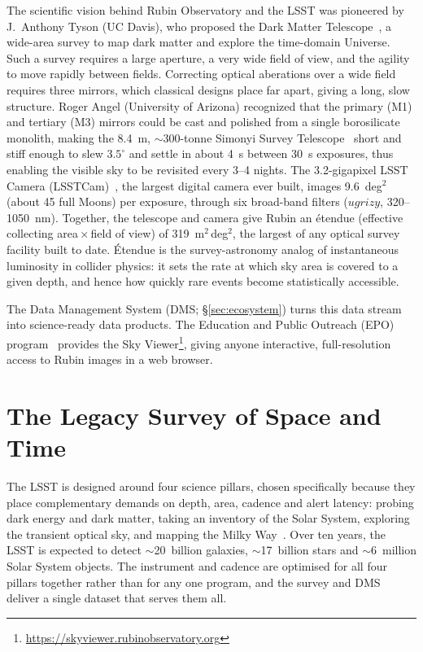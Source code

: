 The scientific vision behind Rubin Observatory and the LSST was pioneered by J.\ Anthony Tyson (UC Davis), who proposed the Dark Matter Telescope~\cite[][]{2001ASPC..237..417T}, a wide-area survey to map dark matter and explore the time-domain Universe.
Such a survey requires a large aperture, a very wide field of view, and the agility to move rapidly between fields.
Correcting optical aberations over a wide field requires three mirrors, which classical designs place far apart, giving a long, slow structure.
Roger Angel (University of Arizona) recognized that the primary (M1) and tertiary (M3) mirrors could be cast and polished from a single borosilicate monolith, making the 8.4~m, $\sim$300-tonne Simonyi Survey Telescope~\cite{2024SPIE13094E..09S} short and stiff enough to slew $3.5^\circ$ and settle in about 4~s between 30~s exposures, thus enabling the visible sky to be revisited every 3--4 nights.
The 3.2-gigapixel LSST Camera (LSSTCam)~\cite{2024SPIE13096E..1SR,2024SPIE13096E..1OL}, the largest digital camera ever built, images 9.6~deg$^2$ (about 45 full Moons) per exposure, through six broad-band filters ($ugrizy$, 320--1050~nm).
Together, the telescope and camera give Rubin an \'etendue (effective collecting area\,$\times$\,field of view) of 319~m$^2$\,deg$^2$, the largest of any optical survey facility built to date.
\'Etendue is the survey-astronomy analog of instantaneous luminosity in collider physics: it sets the rate at which sky area is covered to a given depth, and hence how quickly rare events become statistically accessible.

The Data Management System (DMS; \S\ref{sec:ecosystem}) turns this data stream into science-ready data products.
The Education and Public Outreach (EPO)  program~\cite{2014SPIE9150E..14B} provides the Sky Viewer\footnote{\url{https://skyviewer.rubinobservatory.org}}, giving anyone interactive, full-resolution access to Rubin images in a web browser.

\section{The Legacy Survey of Space and Time}
\label{sec:survey}
%
The LSST is designed around four science pillars, chosen specifically because they place complementary demands on depth, area, cadence and alert latency: probing dark energy and dark matter, taking an inventory of the Solar System, exploring the transient optical sky, and mapping the Milky Way~\cite{2019ApJ...873..111I}.
Over ten years, the LSST is expected to detect $\sim$20~billion galaxies, $\sim$17~billion stars and $\sim$6~million Solar System objects.
The instrument and cadence are optimised for all four pillars together rather than for any one program, and the survey and DMS deliver a single dataset that serves them all.

